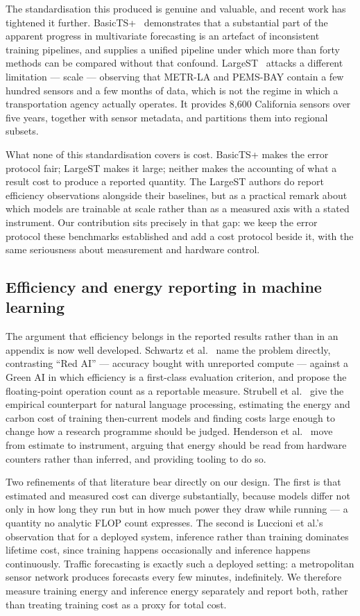 \documentclass[manuscript,screen,review]{acmart}
\begin{document}
The standardisation this produced is genuine and valuable, and recent work has
tightened it further. BasicTS+~\cite{shao2024basicts} demonstrates that a
substantial part of the apparent progress in multivariate forecasting is an
artefact of inconsistent training pipelines, and supplies a unified pipeline
under which more than forty methods can be compared without that confound.
LargeST~\cite{liu2023largest} attacks a different limitation --- scale ---
observing that METR-LA and PEMS-BAY contain a few hundred sensors and a few
months of data, which is not the regime in which a transportation agency
actually operates. It provides 8,600 California sensors over five years,
together with sensor metadata, and partitions them into regional subsets.

What none of this standardisation covers is cost. BasicTS+ makes the error
protocol fair; LargeST makes it large; neither makes the accounting of what a
result cost to produce a reported quantity. The LargeST authors do report
efficiency observations alongside their baselines, but as a practical remark
about which models are trainable at scale rather than as a measured axis with
a stated instrument. Our contribution sits precisely in that gap: we keep the
error protocol these benchmarks established and add a cost protocol beside it,
with the same seriousness about measurement and hardware control.

\subsection{Efficiency and energy reporting in machine learning}
The argument that efficiency belongs in the reported results rather than in an
appendix is now well developed. Schwartz et al.~\cite{schwartz2020greenai}
name the problem directly, contrasting ``Red AI'' --- accuracy bought with
unreported compute --- against a Green AI in which efficiency is a first-class
evaluation criterion, and propose the floating-point operation count as a
reportable measure. Strubell et al.~\cite{strubell2019energy} give the
empirical counterpart for natural language processing, estimating the energy
and carbon cost of training then-current models and finding costs large enough
to change how a research programme should be judged. Henderson et
al.~\cite{henderson2020systematic} move from estimate to instrument, arguing
that energy should be read from hardware counters rather than inferred, and
providing tooling to do so.

Two refinements of that literature bear directly on our design. The first is
that estimated and measured cost can diverge substantially, because models
differ not only in how long they run but in how much power they draw while
running --- a quantity no analytic FLOP count expresses. The second is
Luccioni et al.'s~\cite{luccioni2024power} observation that for a deployed
system, inference rather than training dominates lifetime cost, since training
happens occasionally and inference happens continuously. Traffic forecasting
is exactly such a deployed setting: a metropolitan sensor network produces
forecasts every few minutes, indefinitely. We therefore measure training
energy and inference energy separately and report both, rather than treating
training cost as a proxy for total cost.
\end{document}
